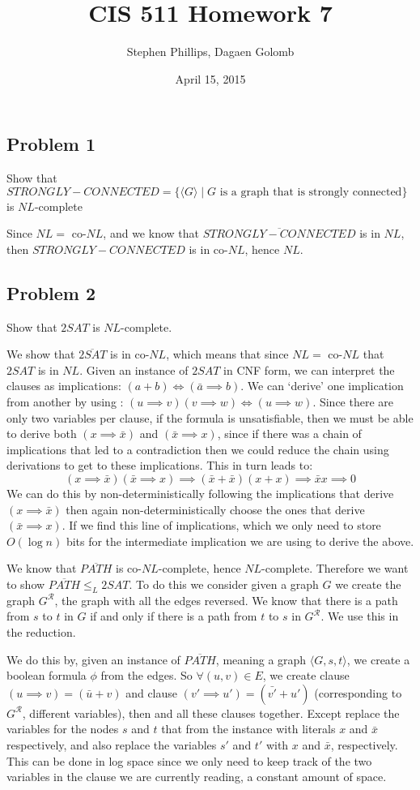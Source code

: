 \documentclass[english]{article}
\title{CIS 511 Homework 7}
\author{Stephen Phillips, Dagaen Golomb}
\date{April 15, 2015}
\begin{document}
\maketitle
\subsection*{Problem 1}
Show that $STRONGLY-CONNECTED = \{ \langle G \rangle \mid G \textrm{ is a graph that is strongly connected} \}$
is $NL$-complete

Since $NL =$ co-$NL$, and we know that $\overline{STRONGLY-CONNECTED}$ is in $NL$, then $STRONGLY-CONNECTED$ is in
co-$NL$, hence $NL$. 

\subsection*{Problem 2}
Show that $2SAT$ is $NL$-complete.

We show that $\overline{2SAT}$ is in co-$NL$, which means that since $NL =$ co-$NL$ that $2SAT$ is in $NL$. Given
an instance of $2SAT$ in CNF form, we can interpret the clauses as implications: $(a + b) \iff (\bar{a} \implies b)$.
We can `derive' one implication from another by using : $(u \implies v)(v \implies w) \iff (u \implies w)$.
Since there are only two variables per clause, if the formula is unsatisfiable, then we must be able to derive both
$(x \implies \bar{x})$ and $(\bar{x} \implies x)$, since if there was a chain of implications that led to a 
contradiction then we could reduce the chain using derivations to get to these implications.
This in turn leads to:
\[ (x \implies \bar{x})(\bar{x} \implies x) 
\implies (\bar{x} + \bar{x})(x + x) 
\implies \bar{x}x \implies 0 
\]
We can do this by non-deterministically following the implications that derive $(x \implies \bar{x})$ then again
non-deterministically choose the ones that derive $(\bar{x} \implies x)$. If we find this line of implications, 
which we only need to store $O(\log n)$ bits for the intermediate implication we are using to derive the above.

We know that $\overline{PATH}$ is co-$NL$-complete, hence $NL$-complete. Therefore we want to show
$\overline{PATH} \le_L 2SAT$. To do this we consider given a graph $G$ we create the graph $G^\mathcal{R}$, the
graph with all the edges reversed. We know that there is a path from $s$ to $t$ in $G$ if and only if there is a
path from $t$ to $s$ in $G^\mathcal{R}$. We use this in the reduction. 

We do this by, given an instance of $\overline{PATH}$, meaning a graph $\langle G, s, t \rangle$, we create a boolean
formula $\phi$ from the edges. So $\forall (u,v) \in E$, we create clause $(u \implies v) = (\bar{u} + v)$ and clause
$(v' \implies u') = (\bar{v'} + u')$ (corresponding to $G^\mathcal{R}$, different variables), then and all these
clauses together. Except replace the variables for the nodes $s$ and $t$ that from the instance with literals $x$ and
$\bar{x}$ respectively, and also replace the variables $s'$ and $t'$ with $x$ and $\bar{x}$, respectively.
This can be done in log space since we only need to keep track of the two variables in the clause we are currently
reading, a constant amount of space. 
\end{document}
